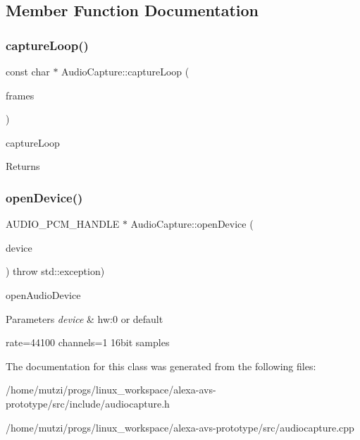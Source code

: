 \subsection{Member Function Documentation}
\mbox{\label{classAudio_1_1AudioCapture_af28ac994176fa3d13ac585200bd9c085}} 
\subsubsection{\texorpdfstring{capture\+Loop()}{captureLoop()}}
{\footnotesize\ttfamily const char $\ast$ Audio\+Capture\+::capture\+Loop (\begin{DoxyParamCaption}\item[{snd\+\_\+pcm\+\_\+uframes\+\_\+t \&}]{frames }\end{DoxyParamCaption})}



capture\+Loop 

\begin{DoxyReturn}{Returns}

\end{DoxyReturn}
\mbox{\label{classAudio_1_1AudioCapture_aa8bf234e7728124d90166950a178cc43}} 
\subsubsection{\texorpdfstring{open\+Device()}{openDevice()}}
{\footnotesize\ttfamily A\+U\+D\+I\+O\+\_\+\+P\+C\+M\+\_\+\+H\+A\+N\+D\+LE $\ast$ Audio\+Capture\+::open\+Device (\begin{DoxyParamCaption}\item[{const char $\ast$}]{device }\end{DoxyParamCaption}) throw  std\+::exception) }



open\+Audio\+Device 


\begin{DoxyParams}{Parameters}
{\em device} & hw\+:0 or default\\
\hline
\end{DoxyParams}
rate=44100 channels=1 16bit samples 

The documentation for this class was generated from the following files\+:\begin{DoxyCompactItemize}
\item 
/home/mutzi/progs/linux\+\_\+workspace/alexa-\/avs-\/prototype/src/include/audiocapture.\+h\item 
/home/mutzi/progs/linux\+\_\+workspace/alexa-\/avs-\/prototype/src/audiocapture.\+cpp\end{DoxyCompactItemize}

